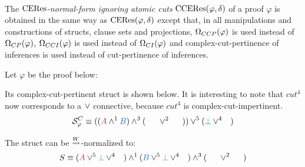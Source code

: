 \documentclass{llncs}
\begin{document}
\begin{definition}
\label{definition:CEResNormalFormIgnoringAtomicCuts} \hspace*{\fill} \\
The \emph{$\CERes$-normal-form ignoring atomic cuts} $\CEResNFComplex{\varphi}{\delta}$ of a proof $\varphi$ is obtained in the same way as $\CEResNF{\varphi}{\delta}$ except that, in all manipulations and constructions of structs, clause sets and projections, $\occCutPertComplex{\varphi}$ is used instead of $\occCutPert{\varphi}$, $\occCutImpertComplex{\varphi}$ is used instead of $\occCutImpert{\varphi}$ and complex-cut-pertinence of inferences is used instead of cut-pertinence of inferences.
\end{definition}

\begin{example}
\label{example:CEResNormalFormIgnoringAtomicCuts}

Let $\varphi$ be the proof below:

\begin{prooftree}
		 
	 
						 
					 
					 
									 
								 
\end{prooftree}

Its complex-cut-pertinent struct is shown below. It is interesting to note that $cut^4$ now corresponds to a $\structtimes$ connective, because $cut^4$ is complex-cut-impertinent.
$$
\cutpertstruct{\varphi}^C 
\equiv 
((\hA{A} \structplus^1 \hB{B}) \structplus^3 (\hC{\structdual{B}} \structtimes^2 \hD{\structdual{A}}))
\structtimes^5
(\hE{\structtimesEmpty} \structtimes^4 \hF{\structtimesEmpty})
$$

The struct can be $\normalizePlusTimesS$-normalized to:
$$
S
\equiv
	(\hA{A}\structtimes^5 \hE{\structtimesEmpty} \structtimes^4 \hF{\structtimesEmpty}) 
\structplus^1 
	(\hB{B}\structtimes^5 \hE{\structtimesEmpty} \structtimes^4 \hF{\structtimesEmpty}) 
\structplus^3 
	(\hC{\structdual{B}} \structtimes^2 \hD{\structdual{A}})
$$


\end{example}
\end{document}

